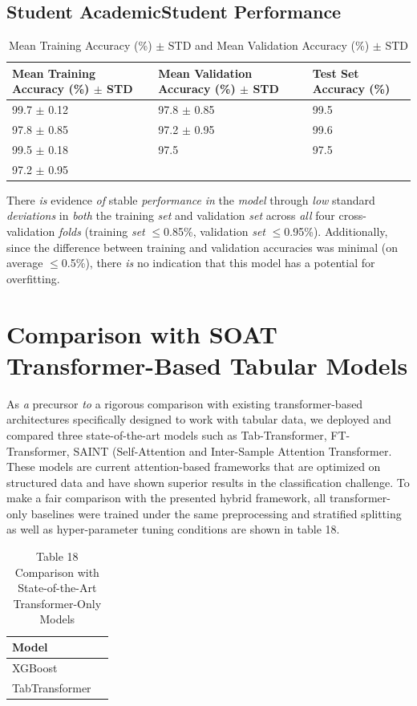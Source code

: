 \documentclass[twocolumn]{svjour3}
\begin{document}
\subsection{Student AcademicStudent Performance}
\begin{table}
\centering
\caption{Mean Training Accuracy (\%) $\pm$ STD and Mean Validation Accuracy (\%) $\pm$ STD}
\begin{tabular}{lll}
\hline
Mean Training Accuracy (\%) $\pm$ STD & Mean Validation Accuracy (\%) $\pm$ STD & Test Set Accuracy (\%) \\
\hline
99.7 $\pm$ 0.12 & 97.8 $\pm$ 0.85 & 99.5 \\
97.8 $\pm$ 0.85 & 97.2 $\pm$ 0.95 & 99.6 \\
99.5 $\pm$ 0.18 & 97.5 & 97.5 \\
97.2 $\pm$ 0.95 & & \\
\hline
\end{tabular}
\end{table}
There \textit{is} evidence \textit{of} stable \textit{performance} \textit{in} the \textit{model} through \textit{low} standard \textit{deviations} in \textit{both} the training \textit{set} and validation \textit{set} across \textit{all} four cross-validation \textit{folds} (training \textit{set} $\leq$0.85\%, validation \textit{set} $\leq$0.95\%). Additionally, since the difference between training and validation accuracies was minimal (on average $\leq$0.5\%), there \textit{is} no indication that this model has a potential for overfitting.
\section{Comparison with SOAT Transformer-Based Tabular Models}
As \textit{a} precursor \textit{to} a rigorous comparison with existing transformer-based architectures specifically designed to work with tabular data, we deployed and compared three state-of-the-art models such as Tab-Transformer, FT-Transformer, SAINT (Self-Attention and Inter-Sample Attention Transformer. These models are current attention-based frameworks that are optimized on structured data and have shown superior results in the classification challenge. To make a fair comparison with the presented hybrid framework, all transformer-only baselines were trained under the same preprocessing and stratified splitting as well as hyper-parameter tuning conditions are shown in table 18.
\begin{table}
\centering
\caption{Table 18 Comparison with State-of-the-Art Transformer-Only Models}
\begin{tabular}{ll}
\hline
Model & \\
\hline
XGBoost & \\
TabTransformer & \\
\hline
\end{tabular}
\end{table}
\end{document}
